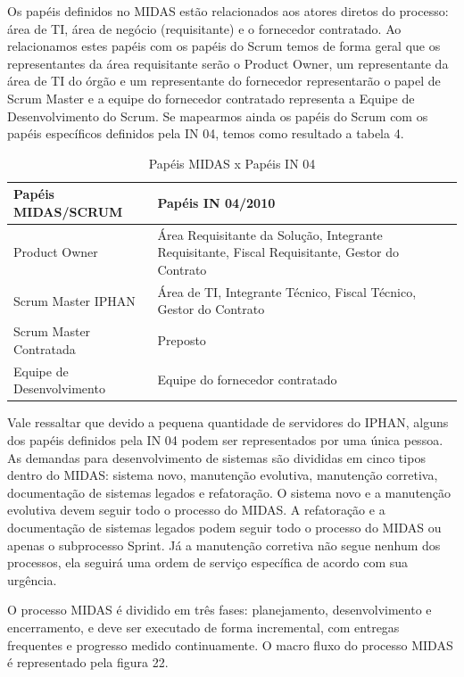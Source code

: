 \begin{anexosenv}
Os papéis definidos no MIDAS estão relacionados aos atores diretos do processo: área de TI, área de negócio (requisitante) e o fornecedor contratado. Ao relacionamos estes papéis com os papéis do Scrum temos de forma geral que os representantes da área requisitante serão o Product Owner, um representante da área de TI do órgão e um representante do fornecedor representarão o papel de Scrum Master e a equipe do fornecedor contratado representa a Equipe de Desenvolvimento do Scrum. Se mapearmos ainda os papéis do Scrum com os papéis específicos definidos pela IN 04, temos como resultado a tabela 4. 

\begin{table}[H]
\center
\footnotesize
\begin{tabular}{|p{6cm}|p{6cm}|}
  \hline
   \textbf{Papéis MIDAS/SCRUM} & \textbf{Papéis IN 04/2010}\\
    \hline
   Product Owner & Área Requisitante da Solução, Integrante Requisitante, Fiscal Requisitante, Gestor do Contrato\\
   \hline    
    Scrum Master IPHAN & Área de TI, Integrante Técnico, Fiscal Técnico, Gestor do Contrato\\
    \hline
   Scrum Master Contratada & Preposto\\
   \hline
    Equipe de Desenvolvimento & Equipe do fornecedor contratado\\
   \hline
\end{tabular}
\caption{Papéis MIDAS x Papéis IN 04}
\end{table}

Vale ressaltar que devido a pequena quantidade de servidores do IPHAN, alguns dos papéis definidos pela IN 04  podem ser representados por uma única pessoa.
As demandas para desenvolvimento de sistemas são divididas em cinco tipos dentro do MIDAS: sistema novo, manutenção evolutiva, manutenção corretiva, documentação de sistemas legados e refatoração.  O sistema novo e a manutenção evolutiva devem seguir todo o processo do MIDAS. A refatoração e a documentação de sistemas legados podem seguir todo o processo do MIDAS ou apenas o subprocesso Sprint. Já a manutenção corretiva não segue nenhum dos processos, ela seguirá uma ordem de serviço específica de acordo com sua urgência.

O processo MIDAS é dividido em três fases: planejamento, desenvolvimento e encerramento, e deve ser executado de forma incremental, com entregas frequentes e progresso medido continuamente. O macro fluxo do processo MIDAS é representado pela figura 22.


\end{anexosenv}
